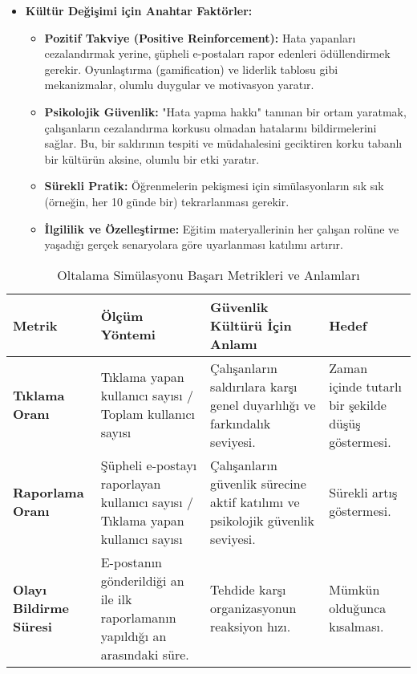 \begin{itemize}
    \item \textbf{Kültür Değişimi için Anahtar Faktörler:}
    \begin{itemize}
        \item \textbf{Pozitif Takviye (Positive Reinforcement):} Hata yapanları cezalandırmak yerine, şüpheli e-postaları rapor edenleri ödüllendirmek gerekir. Oyunlaştırma (gamification) ve liderlik tablosu gibi mekanizmalar, olumlu duygular ve motivasyon yaratır.
        \item \textbf{Psikolojik Güvenlik:} "Hata yapma hakkı" tanınan bir ortam yaratmak, çalışanların cezalandırma korkusu olmadan hatalarını bildirmelerini sağlar. Bu, bir saldırının tespiti ve müdahalesini geciktiren korku tabanlı bir kültürün aksine, olumlu bir etki yaratır.
        \item \textbf{Sürekli Pratik:} Öğrenmelerin pekişmesi için simülasyonların sık sık (örneğin, her 10 günde bir) tekrarlanması gerekir.
        \item \textbf{İlgililik ve Özelleştirme:} Eğitim materyallerinin her çalışan rolüne ve yaşadığı gerçek senaryolara göre uyarlanması katılımı artırır.
    \end{itemize}
\end{itemize}

\begin{longtable}{|>{\footnotesize}p{1.8cm}|>{\footnotesize}p{2.2cm}|>{\footnotesize}p{2.2cm}|>{\footnotesize}p{2cm}|}
    \caption{Oltalama Simülasyonu Başarı Metrikleri ve Anlamları} \\
    \hline
    \textbf{Metrik} & \textbf{Ölçüm Yöntemi} & \textbf{Güvenlik Kültürü İçin Anlamı} & \textbf{Hedef} \\
    \hline
    \endhead
    \textbf{Tıklama Oranı} & Tıklama yapan kullanıcı sayısı / Toplam kullanıcı sayısı & Çalışanların saldırılara karşı genel duyarlılığı ve farkındalık seviyesi. & Zaman içinde tutarlı bir şekilde düşüş göstermesi. \\
    \hline
    \textbf{Raporlama Oranı} & Şüpheli e-postayı raporlayan kullanıcı sayısı / Tıklama yapan kullanıcı sayısı & Çalışanların güvenlik sürecine aktif katılımı ve psikolojik güvenlik seviyesi. & Sürekli artış göstermesi. \\
    \hline
    \textbf{Olayı Bildirme Süresi} & E-postanın gönderildiği an ile ilk raporlamanın yapıldığı an arasındaki süre. & Tehdide karşı organizasyonun reaksiyon hızı. & Mümkün olduğunca kısalması. \\
    \hline
\end{longtable}

